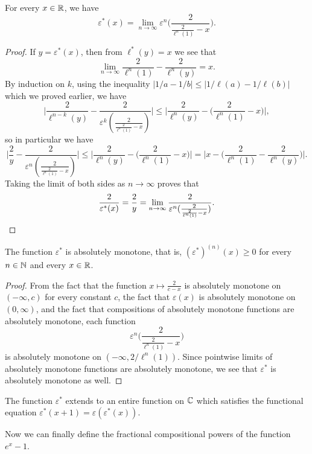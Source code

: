 \documentclass[letterpaper,11pt]{article}
\begin{document}
\begin{prop} For every $x \in \mathbb{R}$, we have
\[
\varepsilon^*(x) = \lim_{n \rightarrow \infty} \varepsilon^{n}\Big(\frac{2}{\frac{2}{\ell^n(1)} - x}\Big).
\]
\end{prop}
\begin{proof} If $y = \varepsilon^*(x)$, then from $\ell^*(y) = x$ we see that
\[
\lim_{n \rightarrow \infty} \frac{2}{\ell^n(1)} - \frac{2}{\ell^n(y)} = x.
\]
By induction on $k$, using the inequality $|1/a - 1/b| \le |1/\ell(a) - 1/\ell(b)|$ which we proved earlier, we have
\[
\Big|\frac{2}{\ell^{n-k}(y)} - \frac{2}{\varepsilon^k(\frac{2}{\frac{2}{\ell^n(1)} - x})}\Big| \le \Big|\frac{2}{\ell^n(y)} - \Big(\frac{2}{\ell^n(1)} - x\Big)\Big|,
\]
so in particular we have
\[
\Big|\frac{2}{y} - \frac{2}{\varepsilon^n(\frac{2}{\frac{2}{\ell^n(1)} - x})}\Big| \le \Big|\frac{2}{\ell^n(y)} - \Big(\frac{2}{\ell^n(1)} - x\Big)\Big| = \Big|x - \Big(\frac{2}{\ell^n(1)} - \frac{2}{\ell^n(y)}\Big)\Big|.
\]
Taking the limit of both sides as $n \rightarrow \infty$ proves that
\[
\frac{2}{\varepsilon^*(x)} = \frac{2}{y} = \lim_{n\rightarrow \infty}\frac{2}{\varepsilon^n(\frac{2}{\frac{2}{\ell^n(1)} - x})}.\qedhere
\]
\end{proof}

\begin{cor} The function $\varepsilon^*$ is absolutely monotone, that is, $(\varepsilon^*)^{(n)}(x) \ge 0$ for every $n \in \mathbb{N}$ and every $x \in \mathbb{R}$.
\end{cor}
\begin{proof} From the fact that the function $x \mapsto \frac{2}{c-x}$ is absolutely monotone on $(-\infty, c)$ for every constant $c$, the fact that $\varepsilon(x)$ is absolutely monotone on $(0,\infty)$, and the fact that compositions of absolutely monotone functions are absolutely monotone, each function
\[
\varepsilon^{n}\Big(\frac{2}{\frac{2}{\ell^n(1)} - x}\Big)
\]
is absolutely monotone on $(-\infty, 2/\ell^n(1))$. Since pointwise limits of absolutely monotone functions are absolutely monotone, we see that $\varepsilon^*$ is absolutely monotone as well.
\end{proof}

\begin{cor} The function $\varepsilon^*$ extends to an entire function on $\mathbb{C}$ which satisfies the functional equation $\varepsilon^*(x+1) = \varepsilon(\varepsilon^*(x))$.
\end{cor}

Now we can finally define the fractional compositional powers of the function $e^x - 1$.
\end{document}
